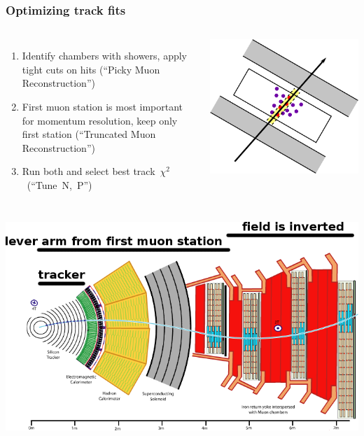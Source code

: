 \documentclass[compress]{beamer}
\begin{document}
\begin{frame}
\frametitle{Optimizing track fits}
\begin{columns}
\small
\begin{enumerate}
\item Identify chambers with showers, apply tight cuts on hits (``Picky Muon Reconstruction'')
\item First muon station is most important for momentum resolution,
keep only first station (``Truncated Muon Reconstruction'')
\item Run both and select best \mbox{track $\chi^2$ (``Tune N, P'') \hspace{-1 cm}}
\end{enumerate}

\includegraphics[width=\linewidth]{showering_hits2.png}
\end{columns}

\begin{center}
\includegraphics[width=0.7\linewidth]{muon_trajectory.png}
\end{center}
\end{frame}
\end{document}
